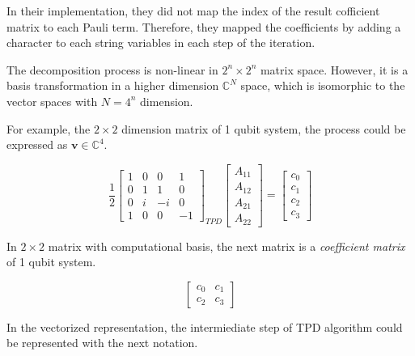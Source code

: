 \documentclass[twocolumn]{article}
\begin{document}
In their implementation, they did not map the index of the result cofficient matrix to 
each Pauli term. Therefore, they mapped the coefficients by adding a character to each string variables 
in each step of the iteration. 

The decomposition process is non-linear in $2^n \times 2^n$ matrix space. 
However, it is a basis transformation in a higher dimension $\mathbb{C}^N$ space, 
which is isomorphic to the vector spaces with $N = 4^n$ dimension.

For example, the $2 \times 2$ dimension matrix of 1 qubit system, the process could be expressed as 
$\mathbf{v} \in \mathbb{C}^4$. 

\begin{equation}
    \frac{1}{2}
    \begin{bmatrix}
        1 & 0 &  0 &  1\\
        0 & 1 &  1 &  0\\ 
        0 & i & -i &  0\\ 
        1 & 0 &  0 & -1 
    \end{bmatrix}_{TPD}
    \begin{bmatrix}
        A_{11} \\
        A_{12} \\
        A_{21} \\
        A_{22}
    \end{bmatrix} =
    \begin{bmatrix}
        c_0\\
        c_1\\
        c_2\\
        c_3
    \end{bmatrix}
\end{equation}

In $2 \times 2$ matrix with computational basis, the next matrix is a \textit{coefficient matrix} of 1 qubit system.

\begin{equation}
    \begin{bmatrix}
        c_0 & c_1\\
        c_2 & c_3
    \end{bmatrix}
\end{equation}

In the vectorized representation, the intermiediate step of TPD algorithm 
could be represented with the next notation. 
\end{document}
